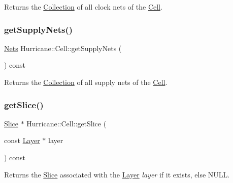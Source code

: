 Returns the \mbox{\hyperlink{classHurricane_1_1Collection}{Collection}} of all clock nets of the \mbox{\hyperlink{classHurricane_1_1Cell}{Cell}}. \mbox{\label{classHurricane_1_1Cell_ac51c8f16de7a4af86feead9f1aecf494}} 
\subsubsection{\texorpdfstring{get\+Supply\+Nets()}{getSupplyNets()}}
{\footnotesize\ttfamily \mbox{\hyperlink{namespaceHurricane_a3404a8b17130a1824f4a281704b04df7}{Nets}} Hurricane\+::\+Cell\+::get\+Supply\+Nets (\begin{DoxyParamCaption}{ }\end{DoxyParamCaption}) const}

Returns the \mbox{\hyperlink{classHurricane_1_1Collection}{Collection}} of all supply nets of the \mbox{\hyperlink{classHurricane_1_1Cell}{Cell}}. \mbox{\label{classHurricane_1_1Cell_ac438b5b6b8dbcd868d6bf0deeb469444}} 
\subsubsection{\texorpdfstring{get\+Slice()}{getSlice()}}
{\footnotesize\ttfamily \mbox{\hyperlink{classHurricane_1_1Slice}{Slice}} $\ast$ Hurricane\+::\+Cell\+::get\+Slice (\begin{DoxyParamCaption}\item[{const \mbox{\hyperlink{classHurricane_1_1Layer}{Layer}} $\ast$}]{layer }\end{DoxyParamCaption}) const\hspace{0.3cm}{\ttfamily [inline]}}

Returns the \mbox{\hyperlink{classHurricane_1_1Slice}{Slice}} associated with the \mbox{\hyperlink{classHurricane_1_1Layer}{Layer}} {\itshape layer} if it exists, else {\ttfamily N\+U\+LL}. \mbox{\label{classHurricane_1_1Cell_aba933a81e3cacfc05b7bd1660e2a933a}} 

